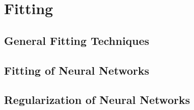 \section{Fitting}


\subsection{General Fitting Techniques}


\subsection{Fitting of Neural Networks}


\subsection{Regularization of Neural Networks}
